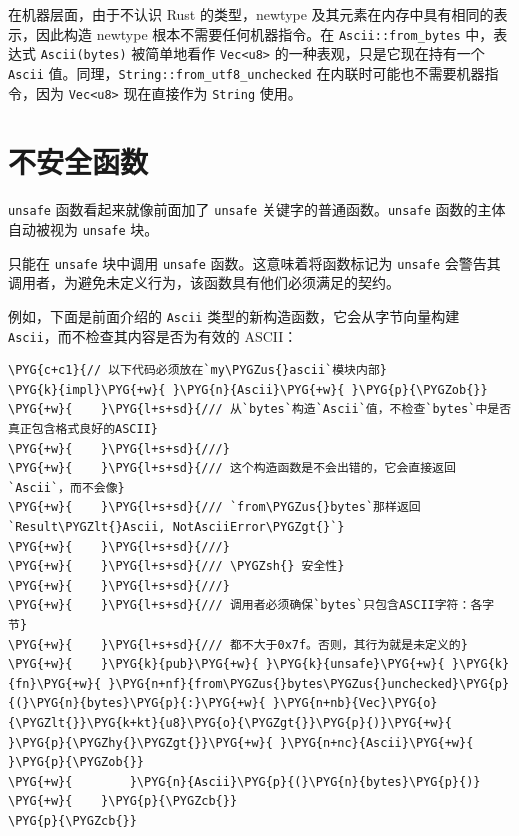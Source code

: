 在机器层面，由于不认识 Rust 的类型，newtype 及其元素在内存中具有相同的表示，因此构造 newtype 根本不需要任何机器指令。在 \texttt{Ascii::from\_bytes} 中，表达式 \texttt{Ascii(bytes)} 被简单地看作 \texttt{Vec<u8>} 的一种表观，只是它现在持有一个 \texttt{Ascii} 值。同理，\texttt{String::from\_utf8\_unchecked} 在内联时可能也不需要机器指令，因为 \texttt{Vec<u8>} 现在直接作为 \texttt{String} 使用。

\section{不安全函数}

\texttt{unsafe} 函数看起来就像前面加了 \texttt{unsafe} 关键字的普通函数。\texttt{unsafe} 函数的主体自动被视为 \texttt{unsafe} 块。

只能在 \texttt{unsafe} 块中调用 \texttt{unsafe} 函数。这意味着将函数标记为 \texttt{unsafe} 会警告其调用者，为避免未定义行为，该函数具有他们必须满足的契约。

例如，下面是前面介绍的 \texttt{Ascii} 类型的新构造函数，它会从字节向量构建 \texttt{Ascii}，而不检查其内容是否为有效的 ASCII：

\begin{Verbatim}[commandchars=\\\{\},breaklines=true,breakanywhere=true,fontsize=\codefont,xleftmargin=17bp]
\PYG{c+c1}{// 以下代码必须放在`my\PYGZus{}ascii`模块内部}
\PYG{k}{impl}\PYG{+w}{ }\PYG{n}{Ascii}\PYG{+w}{ }\PYG{p}{\PYGZob{}}
\PYG{+w}{    }\PYG{l+s+sd}{/// 从`bytes`构造`Ascii`值，不检查`bytes`中是否真正包含格式良好的ASCII}
\PYG{+w}{    }\PYG{l+s+sd}{///}
\PYG{+w}{    }\PYG{l+s+sd}{/// 这个构造函数是不会出错的，它会直接返回`Ascii`，而不会像}
\PYG{+w}{    }\PYG{l+s+sd}{/// `from\PYGZus{}bytes`那样返回`Result\PYGZlt{}Ascii, NotAsciiError\PYGZgt{}`}
\PYG{+w}{    }\PYG{l+s+sd}{///}
\PYG{+w}{    }\PYG{l+s+sd}{/// \PYGZsh{} 安全性}
\PYG{+w}{    }\PYG{l+s+sd}{///}
\PYG{+w}{    }\PYG{l+s+sd}{/// 调用者必须确保`bytes`只包含ASCII字符：各字节}
\PYG{+w}{    }\PYG{l+s+sd}{/// 都不大于0x7f。否则，其行为就是未定义的}
\PYG{+w}{    }\PYG{k}{pub}\PYG{+w}{ }\PYG{k}{unsafe}\PYG{+w}{ }\PYG{k}{fn}\PYG{+w}{ }\PYG{n+nf}{from\PYGZus{}bytes\PYGZus{}unchecked}\PYG{p}{(}\PYG{n}{bytes}\PYG{p}{:}\PYG{+w}{ }\PYG{n+nb}{Vec}\PYG{o}{\PYGZlt{}}\PYG{k+kt}{u8}\PYG{o}{\PYGZgt{}}\PYG{p}{)}\PYG{+w}{ }\PYG{p}{\PYGZhy{}\PYGZgt{}}\PYG{+w}{ }\PYG{n+nc}{Ascii}\PYG{+w}{ }\PYG{p}{\PYGZob{}}
\PYG{+w}{        }\PYG{n}{Ascii}\PYG{p}{(}\PYG{n}{bytes}\PYG{p}{)}
\PYG{+w}{    }\PYG{p}{\PYGZcb{}}
\PYG{p}{\PYGZcb{}}
\end{Verbatim}

